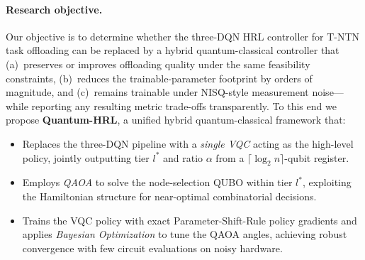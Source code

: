 \documentclass[11pt,a4paper]{article}
\theoremstyle{definition}
\begin{document}
\paragraph{Research objective.}
Our objective is to determine whether the three-DQN HRL controller for T-NTN task offloading can be replaced by a hybrid quantum-classical controller that (a)~preserves or improves offloading quality under the same feasibility constraints, (b)~reduces the trainable-parameter footprint by orders of magnitude, and (c)~remains trainable under NISQ-style measurement noise---while reporting any resulting metric trade-offs transparently. To this end we propose \textbf{Quantum-HRL}, a unified hybrid quantum-classical framework that:
\begin{itemize}
  \item Replaces the three-DQN pipeline with a \emph{single VQC} acting as the high-level policy, jointly outputting tier $l^*$ and ratio $\alpha$ from a $\lceil\log_2 n\rceil$-qubit register.
  \item Employs \emph{QAOA} to solve the node-selection QUBO within tier $l^*$, exploiting the Hamiltonian structure for near-optimal combinatorial decisions.
  \item Trains the VQC policy with exact Parameter-Shift-Rule policy gradients and applies \emph{Bayesian Optimization} to tune the QAOA angles, achieving robust convergence with few circuit evaluations on noisy hardware.
\end{itemize}
\end{document}
